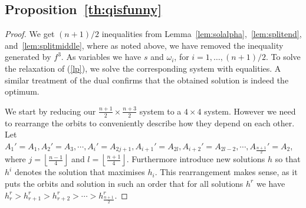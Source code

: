 \documentclass[11pt,a4paper]{article}
\begin{document}
\subsection*{Proposition~\ref{th:qisfunny}}
\begin{proof}
We get $(n+1)/2$ inequalities from Lemma~\ref{lem:solalpha},~\ref{lem:splitend}, 
and~\ref{lem:splitmiddle}, where as noted above, we have removed the inequality
generated by $f^3$.
As variables we have $s$ and $\omega_i$, for $i = 1, \ldots, (n+1)/2$.
To solve the relaxation of (\ref{lp}), we solve the corresponding system with
equalities.
A similar treatment of the dual confirms that the obtained solution is
indeed the optimum.



We start by reducing our $\frac{n+1}{2} \times \frac{n+3}{2}$ system to
a $4 \times 4$ system.
However we need to rearrange the orbits to conveniently describe how they depend on each other. Let $A_1'=A_1, A_2'=A_3,\cdots,A_i'=A_{2j+1}, A_{i+1}'=A_{2l},A_{i+2}'=A_{2l-2},\cdots,A_{\frac{n+1}{2}}'=A_2$, where $j = \left\lfloor\frac{n-1}{4}\right\rfloor$ and $l= \left\lfloor\frac{n+1}{4}\right\rfloor$. Furthermore introduce new solutions $h$ so that $h^i$ denotes the solution that maximises $h_i$. This rearrangement makes sense, as it puts the orbits and solution in such an order that for all solutions $h^r$ we have $h^r_r > h^r_{r+1} > h^r_{r+2} > \cdots > h^r_{\frac{n+1}{2}}$.


\end{proof}
\end{document}

